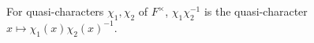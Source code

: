 For quasi-characters $\chi_1,\chi_2$ of $F^\times$, $\chi_1\chi_2^{-1}$ is the quasi-character $x\mapsto\chi_1(x)\chi_2(x)^{-1}$.
